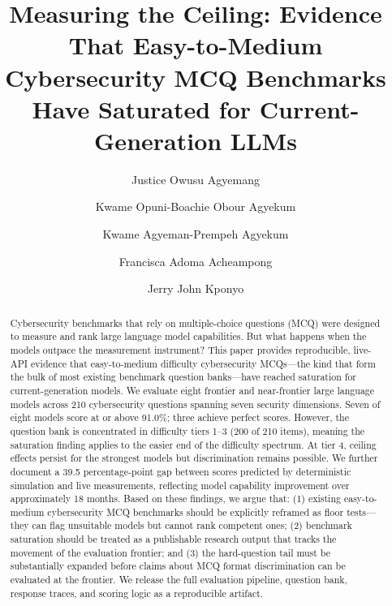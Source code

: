 \documentclass[final]{elsarticle}
\begin{document}
\title{Measuring the Ceiling: Evidence That Easy-to-Medium Cybersecurity MCQ Benchmarks Have Saturated for Current-Generation LLMs}

\author[1,2]{Justice Owusu Agyemang}
\author[1]{Kwame Opuni-Boachie Obour Agyekum}
\author[1]{Kwame Agyeman-Prempeh Agyekum}
\author[1]{Francisca Adoma Acheampong}
\author[2]{Jerry John Kponyo}

\address[1]{VIA Cybersecurity Lab, Kwame Nkrumah University of Science and Technology, Kumasi, Ghana}
\address[2]{Quantum and Assistive Technologies Lab, Kwame Nkrumah University of Science and Technology, Kumasi, Ghana}

\maketitle

\begin{abstract}
Cybersecurity benchmarks that rely on multiple-choice questions (MCQ) were designed to measure and rank large language model capabilities. But what happens when the models outpace the measurement instrument? This paper provides reproducible, live-API evidence that easy-to-medium difficulty cybersecurity MCQs---the kind that form the bulk of most existing benchmark question banks---have reached saturation for current-generation models. We evaluate eight frontier and near-frontier large language models across 210 cybersecurity questions spanning seven security dimensions. Seven of eight models score at or above 91.0\%; three achieve perfect scores. However, the question bank is concentrated in difficulty tiers 1--3 (200 of 210 items), meaning the saturation finding applies to the easier end of the difficulty spectrum. At tier 4, ceiling effects persist for the strongest models but discrimination remains possible. We further document a 39.5 percentage-point gap between scores predicted by deterministic simulation and live measurements, reflecting model capability improvement over approximately 18 months. Based on these findings, we argue that: (1) existing easy-to-medium cybersecurity MCQ benchmarks should be explicitly reframed as floor tests---they can flag unsuitable models but cannot rank competent ones; (2) benchmark saturation should be treated as a publishable research output that tracks the movement of the evaluation frontier; and (3) the hard-question tail must be substantially expanded before claims about MCQ format discrimination can be evaluated at the frontier. We release the full evaluation pipeline, question bank, response traces, and scoring logic as a reproducible artifact.
\end{abstract}
\end{document}
